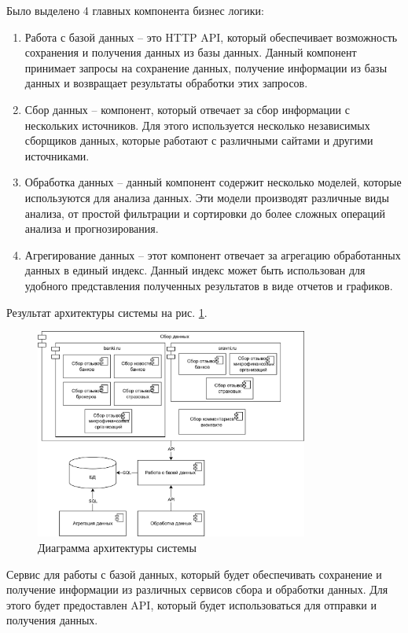 \documentclass[PI, VKR]{HSEUniversity}
\begin{document}
Было выделено 4 главных компонента бизнес логики:
\begin{enumerate}
\item Работа с базой данных -- это HTTP API, который обеспечивает возможность сохранения и получения данных из базы данных. Данный компонент принимает запросы на сохранение данных, получение информации из базы данных и возвращает результаты обработки этих запросов.
\item Сбор данных -- компонент, который отвечает за сбор информации с нескольких источников. Для этого используется несколько независимых сборщиков данных, которые работают с различными сайтами и другими источниками.
\item Обработка данных -- данный компонент содержит несколько моделей, которые используются для анализа данных. Эти модели производят различные виды анализа, от простой фильтрации и сортировки до более сложных операций анализа и прогнозирования.
\item Агрегирование данных -- этот компонент отвечает за агрегацию обработанных данных в единый индекс. Данный индекс может быть использован для удобного представления полученных результатов в виде отчетов и графиков.
\end{enumerate}

Результат архитектуры системы на рис. \ref{fig:architecture}.

\begin{figure}[h!]
\centering
\includegraphics[width=0.8\textwidth]{img/architecture.png}
\caption{\label{fig:architecture}Диаграмма архитектуры системы}
\end{figure}

Сервис для работы с базой данных, который будет обеспечивать сохранение и получение информации из различных сервисов сбора и обработки данных. Для этого будет предоставлен API, который будет использоваться для отправки и получения данных.
\end{document}
